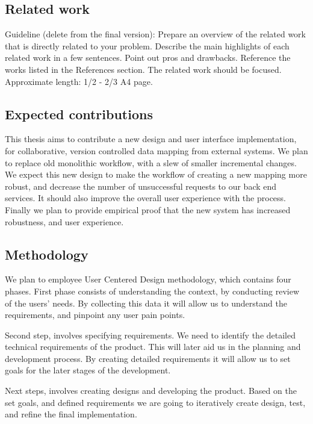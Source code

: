 \documentclass[a4paper, 12pt]{article}
\newcommand\cmnt[1]{\textcolor{munsell}{#1}}
\begin{document}
\subsection{Related work}

\cmnt{
Guideline (delete from the final version):
Prepare an overview of the related work that is directly related to your problem. Describe the main highlights of each related work in a few sentences. Point out pros and drawbacks. Reference the works listed in the References section. The related work should be focused. Approximate length: 1/2 - 2/3 A4 page.}

\subsection{Expected contributions}

This thesis aims to contribute a new design and user interface implementation, for collaborative, version controlled data mapping from external systems. We plan to replace old monolithic workflow, with a slew of smaller incremental changes. We expect this new design to make the workflow of creating a new mapping more robust, and decrease the number of unsuccessful requests to our back end services. It should also improve the overall user experience with the process. Finally we plan to provide empirical proof that the new system has increased robustness, and user experience. 


\subsection{Methodology}

We plan to employee User Centered Design methodology, which contains four phases. First phase consists of understanding the context, by conducting review of the users' needs. By collecting this data it will allow us to understand the requirements, and pinpoint any user pain points.

Second step, involves specifying requirements. We need to identify the detailed technical requirements of the product. This will later aid us in the planning and development process. By creating detailed requirements it will allow us to set goals for the later stages of the development.

Next steps, involves creating designs and developing the product. Based on the set goals, and defined requirements we are going to iteratively create design, test, and refine the final implementation. 
\end{document}
